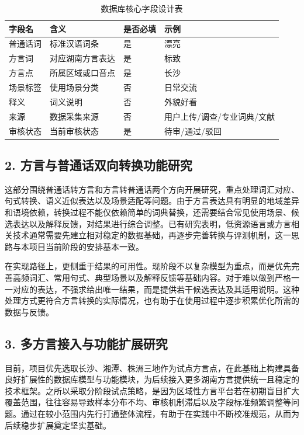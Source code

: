 \documentclass[UTF8]{ctexart}
\begin{document}
\begin{table}[H]
  \centering
  \caption{数据库核心字段设计表}
  \label{tab:fields}
  \small
  \begin{tabularx}{\textwidth}{>{\raggedright\arraybackslash}p{2.2cm} >{\raggedright\arraybackslash}p{3.6cm} >{\raggedright\arraybackslash}p{2cm} Y}
    \toprule
    字段名 & 含义 & 是否必填 & 示例 \\
    \midrule
    普通话词 & 标准汉语词条 & 是 & 漂亮 \\
    方言词 & 对应湖南方言表达 & 是 & 标致 \\
    方言点 & 所属区域或口音点 & 是 & 长沙 \\
    场景标签 & 使用场景分类 & 否 & 日常交流 \\
    释义 & 词义说明 & 否 & 外貌好看 \\
    来源 & 数据采集来源 & 否 & 用户上传/调查/专业词典/文献 \\
    审核状态 & 当前审核状态 & 是 & 待审/通过/驳回 \\
    \bottomrule
  \end{tabularx}
\end{table}

\subsection*{2. 方言与普通话双向转换功能研究}

这部分围绕普通话转方言和方言转普通话两个方向开展研究，重点处理词汇对应、句式转换、语义近似表达以及场景适配等问题。由于方言表达具有明显的地域差异和语境依赖，转换过程不能仅依赖简单的词典替换，还需要结合常见使用场景、候选表达以及解释反馈，对结果进行综合调整。已有研究表明，低资源语言或方言相关技术通常需要先建立相对稳定的数据基础，再逐步完善转换与评测机制\cite{lau2022wordshk,yu2022asr,suen2024pivot}，这一思路与本项目当前阶段的安排基本一致。

在实现路径上，更侧重于结果的可用性。现阶段不以复杂模型为重点，而是优先完善高频词汇、常用句式、典型场景以及解释反馈等基础内容。对于难以做到严格一一对应的表达，不强求给出唯一结果，而是提供若干候选表达及其适用说明。这种处理方式更符合方言转换的实际情况，也有助于在使用过程中逐步积累优化所需的数据与反馈。

\subsection*{3. 多方言接入与功能扩展研究}

目前，项目优先选取长沙、湘潭、株洲三地作为试点方言点，在此基础上构建具备良好扩展性的数据库模型与功能模块，为后续接入更多湖南方言提供统一且稳定的技术框架。之所以采取分阶段试点策略，是因为区域性方言平台若在初期盲目扩大覆盖范围，往往容易导致样本分布不均、审核机制滞后以及字段标准频繁调整等问题。通过在较小范围内先行打通整体流程，有助于在实践中不断校准规范，从而为后续稳步扩展奠定坚实基础。
\end{document}
